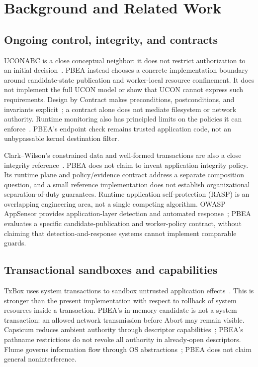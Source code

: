 \documentclass[electronics,article,submit,pdftex,moreauthors]{Definitions/mdpi}
\begin{document}
\section{Background and Related Work}\label{sec:related}
\subsection{Ongoing control, integrity, and contracts}
UCONABC is a close conceptual neighbor: it does not restrict authorization to an initial decision~\cite{park2004ucon}. PBEA instead chooses a concrete implementation boundary around candidate-state publication and worker-local resource confinement. It does not implement the full UCON model or show that UCON cannot express such requirements. Design by Contract makes preconditions, postconditions, and invariants explicit~\cite{meyer1992contract}; a contract alone does not mediate filesystem or network authority. Runtime monitoring also has principled limits on the policies it can enforce~\cite{schneider2000enforceable}. PBEA's endpoint check remains trusted application code, not an unbypassable kernel destination filter.

Clark--Wilson's constrained data and well-formed transactions are also a close integrity reference~\cite{clarkwilson1987integrity}. PBEA does not claim to invent application integrity policy. Its runtime plane and policy/evidence contract address a separate composition question, and a small reference implementation does not establish organizational separation-of-duty guarantees. Runtime application self-protection (RASP) is an overlapping engineering area, not a single competing algorithm. OWASP AppSensor provides application-layer detection and automated response~\cite{owaspAppSensorRevision}; PBEA evaluates a specific candidate-publication and worker-policy contract, without claiming that detection-and-response systems cannot implement comparable guards.

\subsection{Transactional sandboxes and capabilities}
TxBox uses system transactions to sandbox untrusted application effects~\cite{jana2011txbox}. This is stronger than the present implementation with respect to rollback of system resources inside a transaction. PBEA's in-memory candidate is not a system transaction: an allowed network transmission before Abort may remain visible. Capsicum reduces ambient authority through descriptor capabilities~\cite{watson2010capsicum}; PBEA's pathname restrictions do not revoke all authority in already-open descriptors. Flume governs information flow through OS abstractions~\cite{krohn2007flume}; PBEA does not claim general noninterference.
\end{document}

